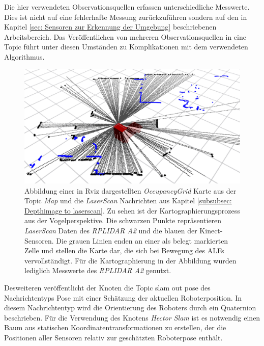 		   		Die hier verwendeten Observationsquellen erfassen unterschiedliche Messwerte. Dies ist nicht auf eine fehlerhafte Messung zurückzuführen sondern auf den in Kapitel \ref{sec: Sensoren zur Erkennung der Umgebung} beschriebenen Arbeitsbereich. Das Veröffentlichen von mehreren Observationsquellen in eine Topic führt unter diesen Umständen zu Komplikationen mit dem verwendeten Algorithmus.
		   		
		   		
		   		\begin{figure}[H]
		   			\centering
		   			\includegraphics[width=1.0\textwidth]{Bilder/hector}
		   			\caption{Abbildung einer in Rviz dargestellten \textit{OccupancyGrid} Karte aus der Topic \textit{Map} und die \textit{LaserScan} Nachrichten aus Kapitel \ref{subsubsec: Depthimage to laserscan}. Zu sehen ist der Kartographierungsprozess aus der Vogelperspektive. Die schwarzen Punkte repräsentieren \textit{LaserScan} Daten des \textit{RPLIDAR A2} und die blauen der Kinect-Sensoren. Die grauen Linien enden an einer als belegt markierten Zelle und stellen die Karte dar, die sich bei Bewegung des ALFs vervollständigt. Für die Kartographierung in der Abbildung wurden lediglich Messwerte des \textit{RPLIDAR A2} genutzt. }
		   			\label{fig: Hector}
		   		\end{figure}
		   		
		   		Desweiteren veröffentlicht der Knoten die Topic \glqq slam out pose\grqq{} des Nachrichtentyps \glqq Pose \grqq{} mit einer Schätzung der aktuellen Roboterposition. In diesem Nachrichtentyp wird die Orientierung des Roboters durch ein Quaternion beschrieben. Für die Verwendung des Knotens \textit{Hector Slam} ist es notwendig einen Baum aus statischen Koordinatentransformationen zu erstellen, der die Positionen aller Sensoren relativ zur geschätzten Roboterpose enthält. \cite{hectorslam}
		   		
